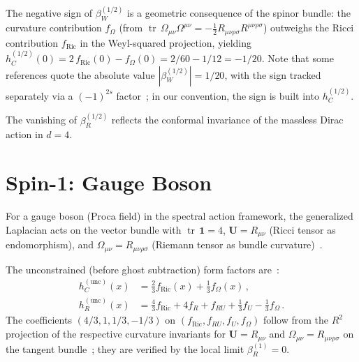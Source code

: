 \documentclass[aps,prd,twocolumn,superscriptaddress,nofootinbib,floatfix]{revtex4-2}
\newcommand{\Riemsq}{R_{\mu\nu\rho\sigma}R^{\mu\nu\rho\sigma}}
\newcommand{\tr}{\operatorname{tr}}
\begin{document}
The negative sign of $\beta_W^{(1/2)}$ is a geometric consequence of the spinor
bundle: the curvature contribution $f_\Omega$ (from
$\tr\,\Omega_{\mu\nu}\Omega^{\mu\nu} = -\frac{1}{2}\Riemsq$) outweighs the
Ricci contribution $f_{\text{Ric}}$ in the Weyl-squared projection, yielding
$h_C^{(1/2)}(0) = 2\,f_{\text{Ric}}(0) - f_\Omega(0) = 2/60 - 1/12 = -1/20$.
Note that some references quote the absolute value $|\beta_W^{(1/2)}| = 1/20$,
with the sign tracked separately via a $(-1)^{2s}$
factor~\cite{Codello:2008vh}; in our convention, the sign is built into
$h_C^{(1/2)}$.

The vanishing of $\beta_R^{(1/2)}$ reflects the conformal invariance of the
massless Dirac action in $d = 4$.


\section{Spin-1: Gauge Boson}
\label{sec:vector}

For a gauge boson (Proca field) in the spectral action framework, the
generalized Laplacian acts on the vector bundle with $\tr\,\mathbf{1} = 4$,
$\mathbf{U} = R_{\mu\nu}$ (Ricci tensor as endomorphism), and
$\Omega_{\mu\nu} = R_{\mu\nu\rho\sigma}$ (Riemann tensor as bundle
curvature)~\cite{Parker:2009uva,Vassilevich:2003xt}.

The unconstrained (before ghost subtraction) form factors
are~\cite{Codello:2012kq}:
\begin{subequations}
\begin{align}
  h_C^{(\text{unc})}(x) &= \frac{2}{3}f_{\text{Ric}}(x)
    + \frac{1}{3}f_\Omega(x)\,,\\
  h_R^{(\text{unc})}(x) &= \frac{4}{3}f_{\text{Ric}} + 4f_R
    + f_{RU} + \frac{1}{3}f_U - \frac{1}{3}f_\Omega\,.
\end{align}
\end{subequations}
The coefficients $(4/3, 1, 1/3, -1/3)$ on
$(f_{\text{Ric}}, f_{RU}, f_U, f_\Omega)$ follow from the $R^2$ projection
of the respective curvature invariants for $\mathbf{U} = R_{\mu\nu}$ and
$\Omega_{\mu\nu} = R_{\mu\nu\rho\sigma}$ on the tangent
bundle~\cite{Barvinsky:1987uw,Codello:2012kq}; they are verified by the local
limit $\beta_R^{(1)} = 0$.
\end{document}

